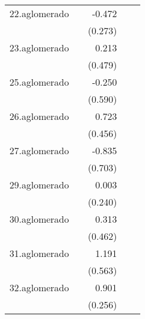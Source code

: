 {\begin{longtable}{l*{4}{D{.}{.}{-1}}}
\addlinespace
22.aglomerado&                     &      -0.472         &                     &                     \\
            &                     &     (0.273)         &                     &                     \\
\addlinespace
23.aglomerado&                     &       0.213         &                     &                     \\
            &                     &     (0.479)         &                     &                     \\
\addlinespace
25.aglomerado&                     &      -0.250         &                     &                     \\
            &                     &     (0.590)         &                     &                     \\
\addlinespace
26.aglomerado&                     &       0.723         &                     &                     \\
            &                     &     (0.456)         &                     &                     \\
\addlinespace
27.aglomerado&                     &      -0.835         &                     &                     \\
            &                     &     (0.703)         &                     &                     \\
\addlinespace
29.aglomerado&                     &       0.003         &                     &                     \\
            &                     &     (0.240)         &                     &                     \\
\addlinespace
30.aglomerado&                     &       0.313         &                     &                     \\
            &                     &     (0.462)         &                     &                     \\
\addlinespace
31.aglomerado&                     &       1.191\sym{*}  &                     &                     \\
            &                     &     (0.563)         &                     &                     \\
\addlinespace
32.aglomerado&                     &       0.901\sym{***}&                     &                     \\
            &                     &     (0.256)         &                     &                     \\

\end{longtable}}
